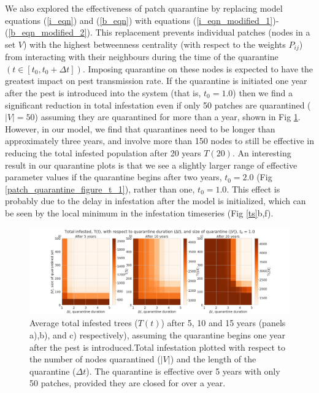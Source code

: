 We also explored the effectiveness of patch quarantine by replacing model equations (\ref{i_eqn}) and (\ref{b_eqn}) with equations (\ref{i_eqn_modified_1})-(\ref{b_eqn_modified_2}). This replacement prevents individual patches (nodes in a set $V$) with the highest betweenness centrality (with respect to the weights $P_{ij}$) from interacting with their neighbours during the time of the quarantine $(t \in [t_0, t_0 + \Delta t])$. Imposing quarantine on these nodes is expected to have the greatest impact on pest transmission rate. If the quarantine is initiated one year after the pest is introduced into the system (that is, $t_0 = 1.0$) then we find a significant reduction in total infestation even if only 50 patches are quarantined ($|V| = 50$) assuming they are quarantined for more than a year, shown in Fig \ref{patch_quarantine_figure_t_0}. However, in our model, we find that quarantines need to be longer than approximately three years, and involve more than 150 nodes to still be effective in reducing the total infested population after 20 years $T(20)$. An interesting result in our quarantine plots is that we see a slightly larger range of effective parameter values if the quarantine begins after two years, $t_0 = 2.0$ (Fig \ref{patch_quarantine_figure_t_1}), rather than one, $t_0 = 1.0$. This effect is probably due to the delay in infestation after the model is initialized, which can be seen by the local minimum in the infestation timeseries (Fig \ref{ts}b,f). 


\begin{figure}[!h]
    \centering
    \includegraphics[width =\textwidth]{chapter_2/node_quarantine_plot_1.0.png}
    \caption[Average total infested trees ($T(t)$) after 5, 10 and 15 years (panels a),b), and c) respectively), assuming the quarantine begins one year after the pest is introduced.]{Average total infested trees ($T(t)$) after 5, 10 and 15 years (panels a),b), and c) respectively), assuming the quarantine begins one year after the pest is introduced.Total infestation plotted with respect to the number of nodes quarantined ($|V|$) and the length of the quarantine ($\Delta t$). The quarantine is effective over 5 years with only 50 patches, provided they are closed for over a year.}
    \label{patch_quarantine_figure_t_0}
\end{figure}

